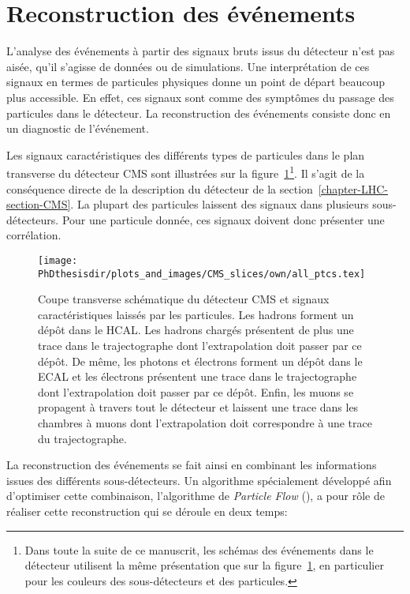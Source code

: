 \section{Reconstruction des événements}\label{chapter-LHC-section-evt_reco}
L'analyse des événements à partir des signaux bruts issus du détecteur n'est pas aisée, qu'il s'agisse de données ou de simulations.
Une interprétation de ces signaux en termes de particules physiques donne un point de départ beaucoup plus accessible.
En effet, ces signaux sont comme des \og symptômes \fg{} du passage des particules dans le détecteur.
La reconstruction des événements consiste donc en un \og diagnostic \fg{} de l'événement.
\par Les signaux caractéristiques des différents types de particules dans le plan transverse du détecteur CMS sont illustrées sur la figure~\ref{fig-chapter-LHC-section-evt_reco-cms_slice}\footnote{Dans toute la suite de ce manuscrit, les schémas des événements dans le détecteur utilisent la même présentation que sur la figure~\ref{fig-chapter-LHC-section-evt_reco-cms_slice}, en particulier pour les couleurs des sous-détecteurs et des particules.}.
Il s'agit de la conséquence directe de la description du détecteur de la section~\ref{chapter-LHC-section-CMS}.
La plupart des particules laissent des signaux dans plusieurs sous-détecteurs.
Pour une particule donnée, ces signaux doivent donc présenter une corrélation.
\begin{figure}[h]
\texttt{[image: \\PhDthesisdir/plots\_and\_images/CMS\_slices/own/all\_ptcs.tex]}
\caption[Coupe transverse schématique du détecteur CMS.]{Coupe transverse schématique du détecteur CMS et signaux caractéristiques laissés par les particules. Les hadrons forment un dépôt dans le HCAL. Les hadrons chargés présentent de plus une trace dans le trajectographe dont l'extrapolation doit passer par ce dépôt. De même, les photons et électrons forment un dépôt dans le ECAL et les électrons présentent une trace dans le trajectographe dont l'extrapolation doit passer par ce dépôt. Enfin, les muons se propagent à travers tout le détecteur et laissent une trace dans les chambres à muons dont l'extrapolation doit correspondre à une trace du trajectographe.}
\label{fig-chapter-LHC-section-evt_reco-cms_slice}
\end{figure}
\par La reconstruction des événements se fait ainsi en combinant les informations issues des différents sous-détecteurs.
Un algorithme spécialement développé afin d'optimiser cette combinaison, l'algorithme de \emph{Particle Flow} (\PF), a pour rôle de réaliser cette reconstruction qui se déroule en deux temps:
